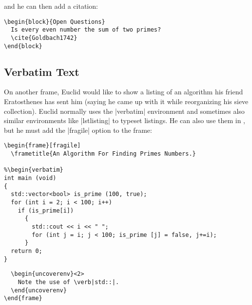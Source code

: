 and he can then add a citation:
\begin{verbatim}
\begin{block}{Open Questions}
  Is every even number the sum of two primes?
  \cite{Goldbach1742}
\end{block}
\end{verbatim}


\subsection{Verbatim Text}

On another frame, Euclid would like to show a listing of an algorithm his friend Eratosthenes has sent him (saying he came up with it while reorganizing his sieve collection). Euclid normally uses the |verbatim| environment and sometimes also similar environments like |lstlisting| to typeset listings. He can also use them in \beamer, but he must add the |fragile| option to the frame:
\begin{verbatim}
\begin{frame}[fragile]
  \frametitle{An Algorithm For Finding Primes Numbers.}

%\begin{verbatim}
int main (void)
{
  std::vector<bool> is_prime (100, true);
  for (int i = 2; i < 100; i++)
    if (is_prime[i])
      {
        std::cout << i << " ";
        for (int j = i; j < 100; is_prime [j] = false, j+=i);
      }
  return 0;
}
\end{verbatim}
\unskip{\MacroFont|\end{verbatim}|}
\begin{verbatim}
  \begin{uncoverenv}<2>
    Note the use of \verb|std::|.
  \end{uncoverenv}
\end{frame}
\end{verbatim}

